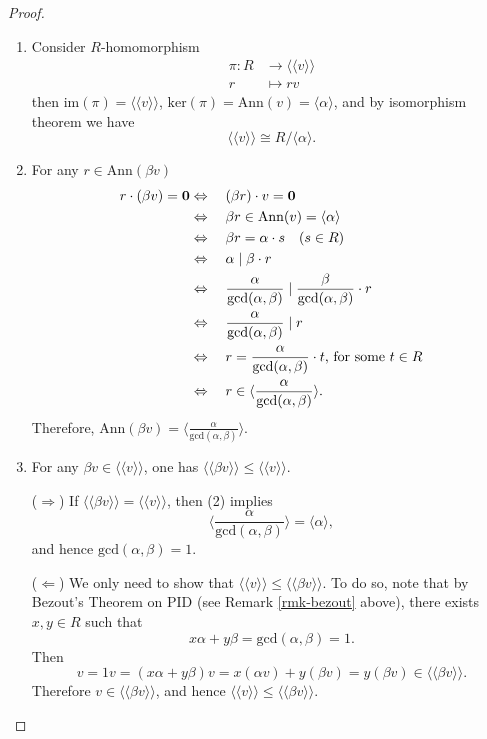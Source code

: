 \documentclass[12pt]{amsbook}
\begin{document}
\begin{proof}
    \begin{enumerate}
        \item Consider $R$-homomorphism 
        \begin{align*}
            \pi :  R&\rightarrow \langle \langle v \rangle\rangle \\
                   r&\mapsto rv
        \end{align*}
        then $\mathrm{im}(\pi)=\langle\langle v\rangle\rangle$, $\mathrm{ker}(\pi)=\mathrm{Ann}(v)=\langle \alpha \rangle $, and by isomorphism theorem we have $$\langle\langle v\rangle\rangle \cong R/\langle \alpha \rangle.$$
        \item For any $r\in \mathrm{Ann}(\beta v)$
        \begin{align*}
            r\cdot(\beta v)={\bf 0} 
            &\Leftrightarrow\quad (\beta r)\cdot v={\bf 0}\\
            &\Leftrightarrow\quad \beta r\in \mathrm{Ann}(v)=\langle \alpha\rangle\\
            &\Leftrightarrow\quad \beta r=\alpha\cdot s\quad(s\in R)\\
            &\Leftrightarrow\quad \alpha \mid\beta\cdot r\\
            &\Leftrightarrow\quad \frac{\alpha}{\mathrm{gcd}(\alpha , \beta)}\mid\frac{\beta}{\mathrm{gcd}(\alpha , \beta)}\cdot r\\
            &\Leftrightarrow\quad \frac{\alpha}{\mathrm{gcd}(\alpha , \beta)}\mid r\\
            &\Leftrightarrow\quad r=\frac{\alpha}{\mathrm{gcd}(\alpha , \beta)}\cdot t\text{, for some }t\in R\\
            &\Leftrightarrow\quad r\in\langle\frac{\alpha}{\mathrm{gcd}(\alpha , \beta)}\rangle.
        \end{align*}
        Therefore, $\mathrm{Ann}(\beta v)=\langle\frac{\alpha}{\mathrm{gcd}(\alpha , \beta)}\rangle$.
        \medskip
        \item For any $\beta v\in \langle\langle v\rangle\rangle$, one has $\langle\langle\beta v\rangle\rangle\leq\langle\langle
         v\rangle\rangle$.

         ($\Rightarrow$) If $\langle\langle \beta v\rangle\rangle=\langle\langle v\rangle\rangle$, then (2) implies
         $$\langle\frac{\alpha}{\mathrm{gcd}(\alpha , \beta)}\rangle=\langle\alpha\rangle,$$
         and hence $\mathrm{gcd}(\alpha, \beta)=1.$

         ($\Leftarrow$) We only need to show that $\langle\langle v\rangle\rangle\leq\langle\langle\beta v\rangle\rangle$. To do so, note that by Bezout's Theorem on PID (see Remark \ref{rmk-bezout} above), there exists $x,y\in R$ such that
         $$x\alpha+y\beta= \mathrm{gcd}(\alpha,\beta) = 1.$$
         Then
        $$v= 1v = (x\alpha+y\beta)v=x(\alpha v)+y(\beta v)=y(\beta v)\in\langle\langle\beta v\rangle\rangle.$$
        Therefore $v\in\langle\langle\beta v\rangle\rangle$, and hence $\langle\langle v\rangle\rangle\leq\langle\langle \beta v\rangle\rangle.$
        
    \end{enumerate}
\end{proof}
\end{document}
